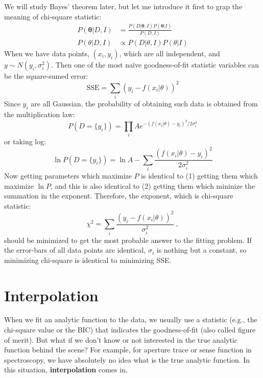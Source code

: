 We will study Bayes' theorem later, but let me introduce it first to grap the meaning of chi-square statistic:
\begin{align*}
  P(\mathbf{\theta}|D, I) &= \frac{P(D|\mathbf{\theta}, I) P(\mathbf{\theta}|I)}{P(D, I)} \\
  P(\theta|D, I) &\propto P(D | \theta, I) P(\theta|I)
\end{align*}
When we have data points, $ (x_i, y_i) $, which are all independent, and $ y \sim N(y_i, \sigma_i^2) $. Then one of the most na\"{i}ve goodness-of-fit statistic variables can be the square-sumed error:
\begin{equation}\label{eq: sse}
  \mathrm{SSE} = \sum_{i} (y_i - f(x_i| \theta))^2
\end{equation}
Since $ y_i $ are all Gaussian, the probability of obtaining such data is obtained from the multiplication law:
\begin{equation*}
  P(D = \{y_i\}) = \prod_i A e^{-(f(x_i|\theta)-y_i)^2/2\sigma_i^2} 
\end{equation*}
or taking log:
\begin{equation}
  \ln P(D = \{y_i\}) = \ln A - \sum_i \frac{ (f(x_i|\theta) - y_i)^2}{2\sigma_i^2}
\end{equation}
Now getting parameters which maximize $ P $ is identical to (1) getting them which maximize $ \ln P $, and this is also identical to (2) getting them which mininize the summation in the exponent. Therefore, the exponent, which is chi-square statistic:
\begin{equation}\label{eq: chi-square statistic}
  \chi^2 = \sum_i \frac{(y_i - f(x_i | \theta))^2}{\sigma_i^2} ~,
\end{equation}
should be minimized to get the most probable answer to the fitting problem. If the error-bars of all data points are identical, $ \sigma_i $ is nothing but a constant, so minimizing chi-square is identical to minimizing SSE.



\section{Interpolation}
When we fit an analytic function to the data, we usually use a statistic (e.g., the chi-square value or the BIC) that indicates the goodness-of-fit (also called figure of merit). But what if we don't know or not interested in the true analytic function behind the scene? For example, for aperture trace or sense function in spectroscopy, we have absolutely no idea what is the true analytic function. In this situation, \textbf{interpolation} comes in. 

